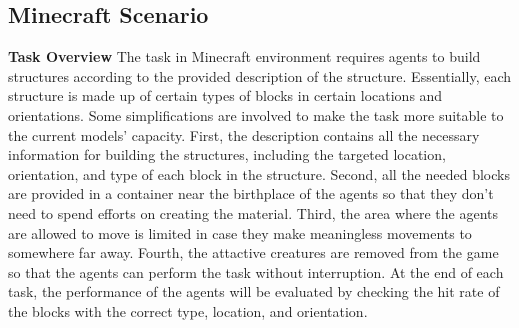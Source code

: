 \subsection{Minecraft Scenario}
\label{app: minecraft-scenario}
\textbf{Task Overview}
The task in Minecraft environment requires agents to build structures according to the provided description of the structure. Essentially, each structure is made up of certain types of blocks in certain locations and orientations. Some simplifications are involved to make the task more suitable to the current models' capacity. First, the description contains all the necessary information for building the structures, including the targeted location, orientation, and type of each block in the structure. Second, all the needed blocks are provided in a container near the birthplace of the agents so that they don't need to spend efforts on creating the material. Third, the area where the agents are allowed to move is limited in case they make meaningless movements to somewhere far away. Fourth, the attactive creatures are removed from the game so that the agents can perform the task without interruption. At the end of each task, the performance of the agents will be evaluated by checking the hit rate of the blocks with the correct type, location, and orientation. 

